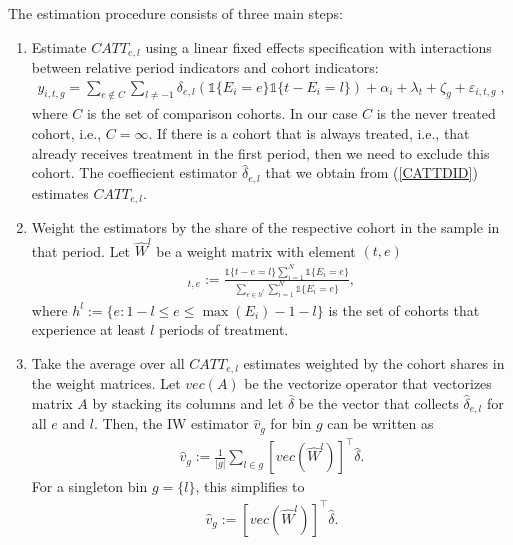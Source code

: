 The estimation procedure consists of three main steps:
\begin{enumerate}
	\item Estimate $CATT_{e, l}$ using a linear fixed effects specification with interactions between relative period indicators and cohort indicators:
	\begin{align} \label{CATTDID}
		y_{i, t, g} = \sum_{e \notin C}^{}\sum_{l \neq -1}^{} \delta_{e, l} (\mathds{1}\{E_i = e\} \mathds{1}\{t - E_i = l\}) + \alpha_i + \lambda_t + \zeta_g + \varepsilon_{i, t, g} \;,
	\end{align}
	where $C$ is the set of comparison cohorts. In our case $C$ is the never treated cohort, i.e., $C = {\infty}$. If there is a cohort that is always treated, i.e., that already receives treatment in the first period, then we need to exclude this cohort. The coeffiecient estimator $\widehat{\delta}_{e, l}$ that we obtain from (\ref{CATTDID}) estimates $CATT_{e, l}$.
	
	\item Weight the estimators by the share of the respective cohort in the sample in that period. Let $\hat{W}^l$ be a weight matrix with element $(t, e)$
	\begin{align*}
		[\widehat{W}^l]_{t, e} := \frac{\mathds{1}\{t - e = l\} \sum_{i = 1}^{N} \mathds{1}\{E_i = e\}}{\sum_{e \in h^{l}} \sum_{i = 1}^{N} \mathds{1}\{E_i = e\}},
	\end{align*}
	where $h^{l} := \{e: 1 - l \leq e \leq \max(E_i) - 1 - l\}$ is the set of cohorts that experience at least $l$ periods of treatment.
	
	\item Take the average over all $CATT_{e, l}$ estimates weighted by the cohort shares in the weight matrices. Let $vec(A)$ be the vectorize operator that vectorizes matrix $A$ by stacking its columns and let $\widehat{\delta}$ be the vector that collects $\widehat{\delta}_{e, l}$ for all $e$ and $l$. Then, the IW estimator $\widehat{v}_g$ for bin $g$ can be written as 
	\begin{align}
		\widehat{v}_g := \frac{1}{|g|} \sum_{l \in g} [vec(\widehat{W}^l)]^\intercal \widehat{\delta}.
	\end{align}
	For a singleton bin $g = \{l\}$, this simplifies to
	\begin{align*}
		\widehat{v}_{g} := [vec(\widehat{W}^l)]^\intercal \widehat{\delta}.
	\end{align*}
	
\end{enumerate}

